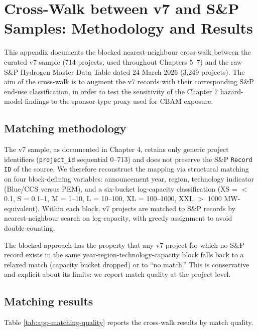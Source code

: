 \documentclass[11pt,a4paper]{article}
\begin{document}
\appendix

\section{Cross-Walk between v7 and S\&P Samples: Methodology and Results}
\label{app:matching}

This appendix documents the blocked nearest-neighbour cross-walk between the curated v7 sample (714 projects, used throughout Chapters 5--7) and the raw S\&P Hydrogen Master Data Table dated 24 March 2026 (3{,}249 projects). The aim of the cross-walk is to augment the v7 records with their corresponding S\&P end-use classification, in order to test the sensitivity of the Chapter 7 hazard-model findings to the sponsor-type proxy used for CBAM exposure.

\subsection{Matching methodology}
\label{app:matching-method}

The v7 sample, as documented in Chapter 4, retains only generic project identifiers (\texttt{project\_id} sequential 0--713) and does not preserve the S\&P \texttt{Record ID} of the source. We therefore reconstruct the mapping via structural matching on four block-defining variables: announcement year, region, technology indicator (Blue/CCS versus PEM), and a six-bucket log-capacity classification (XS = $<$0.1, S = 0.1--1, M = 1--10, L = 10--100, XL = 100--1000, XXL $>$ 1000 MW-equivalent). Within each block, v7 projects are matched to S\&P records by nearest-neighbour search on log-capacity, with greedy assignment to avoid double-counting.

The blocked approach has the property that any v7 project for which no S\&P record exists in the same year-region-technology-capacity block falls back to a relaxed match (capacity bucket dropped) or to ``no match.'' This is conservative and explicit about its limits: we report match quality at the project level.

\subsection{Matching results}

Table \ref{tab:app-matching-quality} reports the cross-walk results by match quality.
\end{document}
